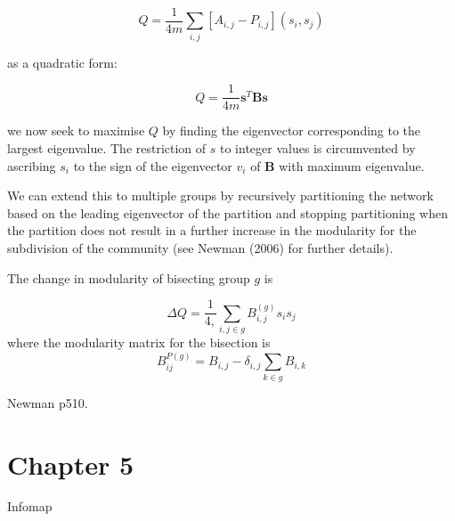 \begin{equation}
Q = \frac{1}{4m}\sum_{i,j}[A_{i,j}-P_{i,j}](s_i,s_j)	
\end{equation}

as a quadratic form:

\begin{equation}
	Q = \frac{1}{4m}\mathbf{s}^T\mathbf{Bs}
\end{equation}


we now seek to maximise $Q$ by finding the eigenvector corresponding to the largest eigenvalue. The restriction of $s$ to integer values is circumvented by ascribing $s_i$ to the sign of the eigenvector $v_i$
of $\mathbf{B}$ with maximum eigenvalue.

We can extend this to multiple groups by recursively partitioning the network based on the leading eigenvector of the partition and stopping partitioning when the partition does not result in a further increase in the modularity for the subdivision of the community (see Newman (2006) for further details).

The change in modularity of bisecting group $g$ is 

\begin{equation}
    \Delta Q = \frac{1}{4,} \sum_{i,j \in g} B_{i,j}^{(g)}s_i s_j
\end{equation}
where the modularity matrix for the bisection is 
\begin{equation}
B_{ij}^{P(g)} = B_{i,j} - \delta_{i,j}\sum_{k \in g} B_{i,k}  
\end{equation}
\label{eq:Change in modularity spectral clustering}

Newman \cite{newman2018networks} p510.
\section{Chapter 5}
Infomap

